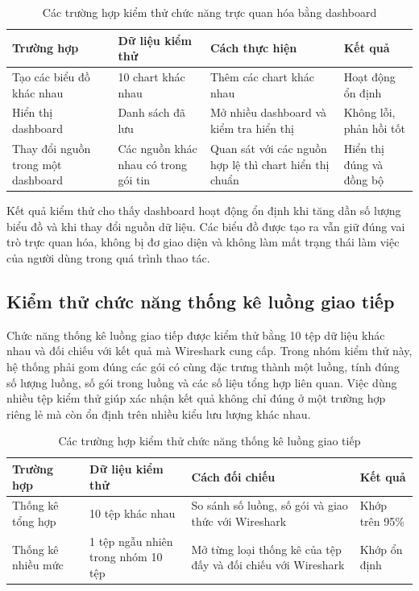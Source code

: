 \documentclass[../DoAn.tex]{subfiles}
\begin{document}
\begin{table}[H]
\centering
\begin{tabular}{p{3.0cm}p{3.8cm}p{4.1cm}p{2.7cm}}
\hline
\textbf{Trường hợp} & \textbf{Dữ liệu kiểm thử} & \textbf{Cách thực hiện} & \textbf{Kết quả} \\ \hline
Tạo các biểu đồ khác nhau & 10 chart khác nhau & Thêm các chart khác nhau & Hoạt động ổn định \\ \hline
Hiển thị dashboard & Danh sách đã lưu & Mở nhiều dashboard và kiểm tra hiển thị & Không lỗi, phản hồi tốt \\ \hline
Thay đổi nguồn trong một dashboard & Các nguồn khác nhau có trong gói tin & Quan sát với các nguồn hợp lệ thì chart hiển thị chuẩn & Hiển thị đúng và đồng bộ \\ \hline
\end{tabular}
\caption{Các trường hợp kiểm thử chức năng trực quan hóa bằng dashboard}
\label{tab:test_dashboard}
\end{table}

Kết quả kiểm thử cho thấy dashboard hoạt động ổn định khi tăng dần số lượng biểu đồ và khi thay đổi nguồn dữ liệu. Các biểu đồ được tạo ra vẫn giữ đúng vai trò trực quan hóa, không bị đơ giao diện và không làm mất trạng thái làm việc của người dùng trong quá trình thao tác.

\subsection{Kiểm thử chức năng thống kê luồng giao tiếp}
Chức năng thống kê luồng giao tiếp được kiểm thử bằng 10 tệp dữ liệu khác nhau và đối chiếu với kết quả mà Wireshark cung cấp. Trong nhóm kiểm thử này, hệ thống phải gom đúng các gói có cùng đặc trưng thành một luồng, tính đúng số lượng luồng, số gói trong luồng và các số liệu tổng hợp liên quan. Việc dùng nhiều tệp kiểm thử giúp xác nhận kết quả không chỉ đúng ở một trường hợp riêng lẻ mà còn ổn định trên nhiều kiểu lưu lượng khác nhau.

\begin{table}[H]
\centering
\begin{tabular}{p{3.0cm}p{4.0cm}p{3.8cm}p{2.8cm}}
\hline
\textbf{Trường hợp} & \textbf{Dữ liệu kiểm thử} & \textbf{Cách đối chiếu} & \textbf{Kết quả} \\ \hline
Thống kê tổng hợp & 10 tệp khác nhau & So sánh số luồng, số gói và giao thức với Wireshark & Khớp trên 95\% \\ \hline
Thống kê nhiều mức & 1 tệp ngẫu nhiên trong nhóm 10 tệp & Mở từng loại thống kê của tệp đấy và đối chiếu với Wireshark & Khớp ổn định \\ \hline
\end{tabular}
\caption{Các trường hợp kiểm thử chức năng thống kê luồng giao tiếp}
\label{tab:test_flow_statistics}
\end{table}
\end{document}
